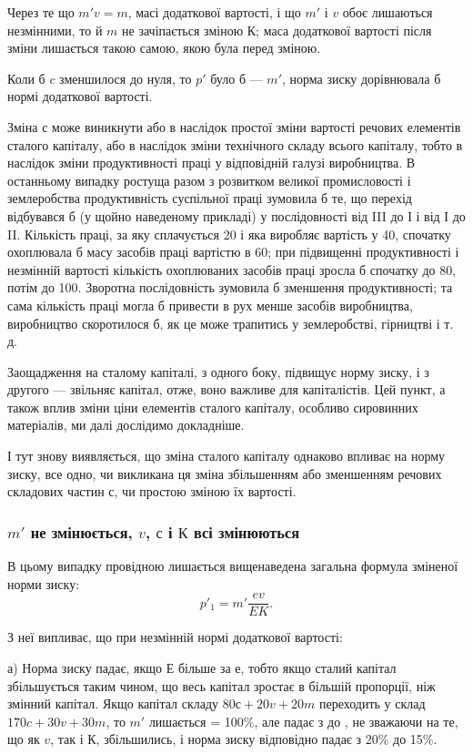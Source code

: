 Через те що  $m'v = m$, масі додаткової вартості, і що $m'$ і $v$
обоє лишаються незмінними, то й $m$ не зачіпається зміною $К$;
маса додаткової вартості після зміни лишається такою самою,
якою була перед зміною.

Коли б $c$ зменшилося до нуля, то $p'$ було б — $m'$, норма зиску
дорівнювала б нормі додаткової вартості.

Зміна $с$ може виникнути або в наслідок простої зміни вартості
речових елементів сталого капіталу, або в наслідок зміни технічного
складу всього капіталу, тобто в наслідок зміни продуктивності
праці у відповідній галузі виробництва. В останньому
випадку ростуща разом з розвитком великої промисловості і
землеробства продуктивність суспільної праці зумовила б те, що
перехід відбувався б (у щойно наведеному прикладі) у послідовності
від III до І і від І до II. Кількість праці, за яку сплачується
20 і яка виробляє вартість у 40, спочатку охоплювала б масу засобів
праці вартістю в 60; при підвищенні продуктивності і незмінній
вартості кількість охоплюваних засобів праці зросла б спочатку
до 80, потім до 100. Зворотна послідовність зумовила б
зменшення продуктивності; та сама кількість праці могла б привести
в рух менше засобів виробництва, виробництво скоротилося
б, як це може трапитись у землеробстві, гірництві і т. д.

Заощадження на сталому капіталі, з одного боку, підвищує
норму зиску, і з другого — звільняє капітал, отже, воно важливе
для капіталістів. Цей пункт, а також вплив зміни ціни елементів
сталого капіталу, особливо сировинних матеріалів, ми далі дослідимо
докладніше.

І тут знову виявляється, що зміна сталого капіталу однаково
впливає на норму зиску, все одно, чи викликана ця зміна збільшенням
або зменшенням речових складових частин $с$, чи простою
зміною їх вартості.

\subsubsection{$m'$ не змінюється, $v$, $с$ і $К$ всі змінюються}

В цьому випадку провідною лишається вищенаведена загальна
формула зміненої норми зиску:
\[
p'_1 = m'\frac{ev}{EK}.
\]

З неї випливає, що при незмінній нормі додаткової вартості:

а) Норма зиску падає, якщо $Е$ більше за $е$, тобто якщо сталий
капітал збільшується таким чином, що весь капітал зростає
в більшій пропорції, ніж змінний капітал. Якщо капітал складу
$80 с + 20 v + 20 m$ переходить у склад $170 c + 30 v + 30 m$, то $m'$
лишається = 100\%, але падає з  до , не зважаючи на те,
що як $v$, так і $К$, збільшились, і норма зиску відповідно падає з
20\% до 15\%.
